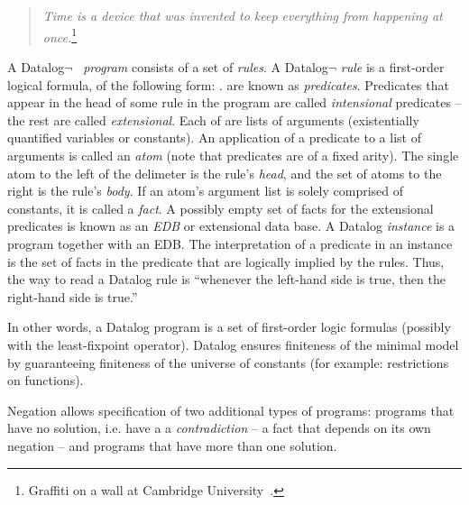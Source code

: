 \section{\large \bf \slang}

\begin{quote}
%
\emph{Time is a device that was invented to keep everything from
happening at once.}\footnote{Graffiti on a wall at Cambridge
University~\cite{scheme}.}
%
\end{quote} 

A Datalog$\lnot$~\cite{ullmanbook} {\em program} consists of a set of {\em rules}.  A Datalog$\lnot$ {\em rule} is a first-order logical formula, of the following form: .   are known as {\em predicates}.  Predicates that appear in the head of some rule in the program are called {\em intensional} predicates -- the rest are called {\em extensional}.  Each of  are lists of arguments (existentially quantified variables or constants).  An application of a predicate to a list of arguments is called an {\em atom} (note that predicates are of a fixed arity).  The single atom to the left of the \dedalus{:-} delimeter is the rule's {\em head}, and the set of atoms to the right is the rule's {\em body}.  If an atom's argument list is solely comprised of constants, it is called a {\em fact}.  A possibly empty set of facts for the extensional predicates is known as an {\em EDB} or extensional data base.  A Datalog {\em instance} is a program together with an EDB.  The interpretation of a predicate in an instance is the set of facts in the predicate that are logically implied by the rules.  Thus, the way to read a Datalog rule is ``whenever the left-hand side is true, then the right-hand side is true.''

In other words, a Datalog program is a set of first-order logic formulas (possibly with the least-fixpoint operator).
  Datalog ensures finiteness of the minimal model by guaranteeing finiteness of the universe of constants (for example: restrictions on functions).

Negation allows specification of two additional types of programs: programs that have no solution, i.e. have a a {\em contradiction} -- a fact that depends on its own negation -- and programs that have more than one solution.  


